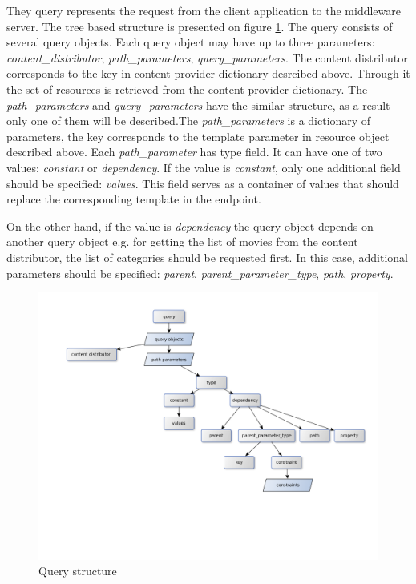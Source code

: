 They query represents the request from the client application to the middleware server. The tree based structure is presented on figure \ref{fig:query_structure}. The query consists of several query objects.
Each query object may have up to three parameters: \textit{content\_distributor}, \textit{path\_parameters}, \textit{query\_parameters}. The content distributor corresponds to the key in content provider dictionary desrcibed above. Through it the set of resources is retrieved from the content provider dictionary. The \textit{path\_parameters} and \textit{query\_parameters} have the similar structure, as a result only one of them will be described.The \textit{path\_parameters} is a dictionary of parameters, the key corresponds to the template parameter in resource object described above. Each \textit{path\_parameter} has type field. It can have one of two values: \textit{constant} or \textit{dependency}. If the value is \textit{constant}, only one additional field should be specified: \textit{values}. This field serves as a container of values that should replace the corresponding template in the endpoint. 

On the other hand, if the value is \textit{dependency} the query object depends on another query object e.g. for getting the list of movies from the content distributor, the list of categories should be requested first. In this case, additional parameters should be specified: \textit{parent}, \textit{parent\_parameter\_type}, \textit{path}, \textit{property}.    


\begin{figure}[h]
    \centering
	\includegraphics[width=\textwidth]{images/query_structure.png}
    \caption{Query structure}
    \label{fig:query_structure}
\end{figure}


